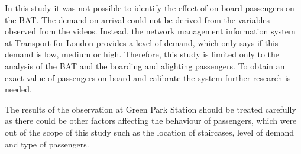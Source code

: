 In this study it was not possible to identify the effect of on-board passengers on the BAT. The demand on arrival could not be derived from the variables observed from the videos. Instead, the network management information system at Transport for London provides a level of demand, which only says if this demand is low, medium or high. Therefore, this study is limited only to the analysis of the BAT and the boarding and alighting passengers. To obtain an exact value of passengers on-board and calibrate the system further research is needed.

The results of the observation at Green Park Station should be treated carefully as there could be other factors affecting the behaviour of passengers, which were out of the scope of this study such as the location of staircases, level of demand and type of passengers.
